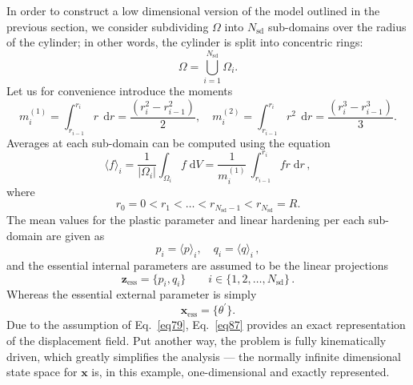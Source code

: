 \documentclass[final,1p,times]{elsarticle}
\newcommand{\be}{\begin{equation}}
\newcommand{\ee}{\end{equation}}
\newcommand{\bfm}[1]{ \mathbf{#1} }
\def\dd{\;\!\mathrm{d}}
\begin{document}
In order to construct a low dimensional version of the model outlined in the previous section, 
we consider subdividing $\Omega$ into $N_\mathrm{sd}$ sub-domains over the radius of the cylinder; in other words,
the cylinder is split into concentric rings:
\be
\label{eq82}
\Omega= \bigcup_{i=1}^{N_\mathrm{sd}} \Omega_{i} .
\ee
Let us for convenience introduce the moments
\be
\label{eq82a}
m^{(1)}_i = \int_{r_{i-1}}^{r_i} r \,\dd r = \frac{(r_i^2-r_{i-1}^2)}{2}, \quad m^{(2)}_i = \int_{r_{i-1}}^{r_i} r^2 \,\dd r = \frac{(r_i^3-r_{i-1}^3)}{3}.
\ee
Averages at each sub-domain can be computed using the equation
\be
\label{eq83}
\langle f \rangle_i =  \frac{1}{|\Omega_i|} \int_{\Omega_i} f \dd V= {\frac{1}{m^{(1)}_i}} \, \int_{r_{i-1}}^{r_i} f r \dd r\,,
\ee
where
\be
\label{eq84}
r_\mathrm{0}=0< r_1< \ldots < r_{N_\mathrm{sd}-1} < r_{N_\mathrm{sd}}=R.
\ee
The mean values for the plastic parameter and linear hardening per each sub-domain are given as
\be
\label{eq85}
p_i =  \langle p \rangle_i, \quad
q_i= \langle q \rangle_i\,,
\ee
and the essential internal parameters are assumed to be the linear projections
\be
\label{eq86} 
\bfm{z}_\mathrm{ess} = \{p_i, q_i\}\qquad i\in\{1,2,\ldots,N_\mathrm{sd}\}\,. 
\ee
Whereas the essential external parameter is simply
\be
\label{eq87}
\bfm{x}_\mathrm{ess} = \{\theta^\prime\}.
\ee
Due to the assumption of Eq.\ \eqref{eq79}, Eq.\ \eqref{eq87} provides an exact representation of the displacement field. Put another way, the problem is fully kinematically driven, which greatly simplifies the analysis --- the normally infinite dimensional state space for $\bfm{x}$ is, in this example, one-dimensional and exactly represented.
\end{document}
